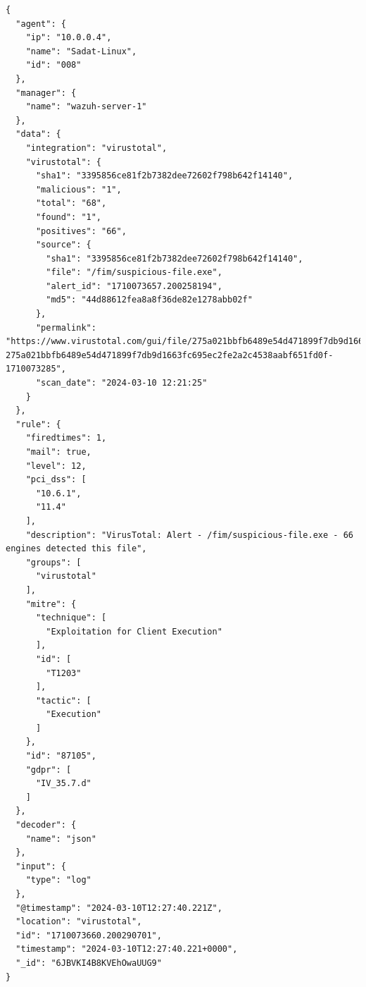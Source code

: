 \begin{verbatim}
{
  "agent": {
    "ip": "10.0.0.4",
    "name": "Sadat-Linux",
    "id": "008"
  },
  "manager": {
    "name": "wazuh-server-1"
  },
  "data": {
    "integration": "virustotal",
    "virustotal": {
      "sha1": "3395856ce81f2b7382dee72602f798b642f14140",
      "malicious": "1",
      "total": "68",
      "found": "1",
      "positives": "66",
      "source": {
        "sha1": "3395856ce81f2b7382dee72602f798b642f14140",
        "file": "/fim/suspicious-file.exe",
        "alert_id": "1710073657.200258194",
        "md5": "44d88612fea8a8f36de82e1278abb02f"
      },
      "permalink": "https://www.virustotal.com/gui/file/275a021bbfb6489e54d471899f7db9d1663fc695ec2fe2a2c4538aabf651fd0f/detection/f-275a021bbfb6489e54d471899f7db9d1663fc695ec2fe2a2c4538aabf651fd0f-1710073285",
      "scan_date": "2024-03-10 12:21:25"
    }
  },
  "rule": {
    "firedtimes": 1,
    "mail": true,
    "level": 12,
    "pci_dss": [
      "10.6.1",
      "11.4"
    ],
    "description": "VirusTotal: Alert - /fim/suspicious-file.exe - 66 engines detected this file",
    "groups": [
      "virustotal"
    ],
    "mitre": {
      "technique": [
        "Exploitation for Client Execution"
      ],
      "id": [
        "T1203"
      ],
      "tactic": [
        "Execution"
      ]
    },
    "id": "87105",
    "gdpr": [
      "IV_35.7.d"
    ]
  },
  "decoder": {
    "name": "json"
  },
  "input": {
    "type": "log"
  },
  "@timestamp": "2024-03-10T12:27:40.221Z",
  "location": "virustotal",
  "id": "1710073660.200290701",
  "timestamp": "2024-03-10T12:27:40.221+0000",
  "_id": "6JBVKI4B8KVEhOwaUUG9"
}
\end{verbatim}
